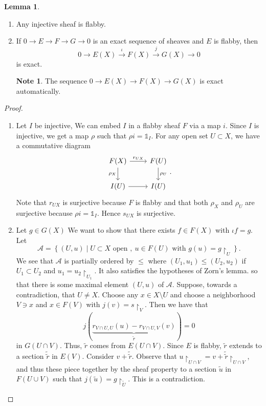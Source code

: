 \documentclass[10pt,letterpaper,cm]{nupset}
\theoremstyle{definition}
\newtheorem{note}[definition]{Note}
\theoremstyle{theorem}
\newtheorem{lemma}[definition]{Lemma}
\theoremstyle{remark}
\newcommand{\1}{\mathbb{1}}
\newcommand{\0}{\vec 0}
\begin{document}
\begin{lemma} $ $
\begin{enumerate}
\item Any injective sheaf is flabby. 
\item If $0 \to E \to F \to G \to 0$ is an exact sequence of sheaves and $E$ is flabby, then $$0 \to E(X) \overset{\iota}{\longrightarrow} F(X) \overset{j}{\longrightarrow} G(X) \to 0$$ is exact. 
\begin{note}
The sequence $0 \to E(X) \to F(X) \to G(X)$ is exact automatically.
\end{note}
\end{enumerate}
\end{lemma}
\begin{proof} $ $
\begin{enumerate}
\item Let $I$ be injective, We can embed $I$ in a flabby sheaf $F$ via a map $i$.  Since $I$ is injective, we get a map $\rho$ such that $\rho{i} = \1_I$.  For any open set $U \subset X$, we have a commutative diagram
\[
\begin{tikzcd}
F(X) \arrow[r, "r_{UX}"] \arrow[d, "\rho_X"'] & F(U) \arrow[d, "\rho_U"] \\
I(U) \arrow[r]                                & I(U)                    
\end{tikzcd}
. \]
Note that $r_{UX}$ is surjective because $F$ is flabby and that both $\rho_X$ and $\rho_U$ are surjective because $\rho{i} = \1_I$. Hence $s_{UX}$ is surjective. 
\item Let $g \in G(X)$ We want to show that there exists $f\in F(X)$ with $\iota{f} =g$. Let $$\mathcal{A} =  \left\{(U, u) \mid U \subset X\text{ open },\ u \in F(U)\text{ with }g(u) = g\restriction_U\right\}.$$ We see that $\mathcal{A}$ is partially ordered by $\leq$ where $\left(U_1, u_1\right) \leq \left(U_2, u_2\right)$ if $U_1 \subset U_2$ and $u_1 = u_2 \restriction_{U_1}$. It also satisfies the hypotheses of Zorn's lemma. so that there is some maximal element $\left(U,u\right)$ of $\mathcal{A}$. Suppose, towards a contradiction, that $U \ne X$. Choose any $x \in X \setminus U$ and choose a neighborhood $V \ni x$ and $x \in F(V)$ with $j(v) = s \restriction_V$. Then we have that $$  j(\underbrace{r_{V \cap U, U}(u) - r_{V \cap U, V}(v)}_{\tilde{r}}) =0  $$ in $G\left(U \cap V\right)$. Thus, $\tilde{r}$ comes from $E\left(U \cap V\right)$. Since $E$ is flabby, $\tilde{r}$ extends to a section $\tilde{\tilde{r}}$ in $E(V)$. Consider $v + \tilde{\tilde{r}}$. Observe that $u \restriction_{U \cap V} = v + \tilde{\tilde{r}}\restriction_{U \cap V}$, and thus these piece together by the sheaf property to a section $\tilde{u}$ in $F(U \cup V)$ such that $j(\tilde{u}) =g \restriction_{\tilde{U}}$. This is a contradiction. 
\end{enumerate}
\end{proof}
\end{document}
